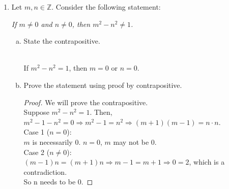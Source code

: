 \documentclass[12pt]{amsart}
\begin{document}
\begin{enumerate}[{\bfseries 1.}]
	\begin{enumerate}[(a)]
	\vspace{0.1in}
	\item State the contrapositive.
	\begin{normalize}
	\vspace{0.1in}
	\\If $x \leq 21$ and $y\leq21$, then $xy\leq441$.
	\\
	\end{normalize}
	\item Prove the original statement using proof by contrapositive.
	\begin{normalize}
	    \begin{proof}
	    \vspace{0.1in}
	    We will prove the contrapositive.
	    \\Let $x\in\mathbb{R}^+$ and $x \leq 21$, $y\in\mathbb{R}^+$ and $y \leq 21$.
	    \\Therefore, $xy \leq 21\cdot 21 = 441$.
	    \end{proof}
	\end{normalize}
	\vfill
	\end{enumerate}

\item Let $m, n\in\mathbb{Z}$.  Consider the following statement:

	\vspace{0.1in}
	\begin{center}
	\noindent
	\textit{If $m\neq 0$ and $n\neq 0$, then $m^{2}-n^{2}\neq 1$.}
	\end{center}

	\begin{enumerate}[(a)]
	\vspace{0.1in}
	\item State the contrapositive.
	\begin{normalize}
	\vspace{0.1in}
	\\If $m^2 - n^2 = 1$, then $m = 0$ or $n = 0$.
	\\
	\end{normalize}
	\item Prove the statement using proof by contrapositive.
	\begin{normalize}
	    \begin{proof}
	    \vspace{0.1in}
	    We will prove the contrapositive.
	    \\Suppose $m^2 - n^2 = 1$. Then, $m^2 - 1 - n^2 = 0 \Rightarrow m^2 - 1 = n^2 \Rightarrow (m+1)(m-1) = n\cdot n$.
	    \\Case 1 ($n = 0$):
	    \\$m$ is necessarily $0$. $n = 0$, $m$ may not be $0$.
	    \\Case 2 ($n \neq 0$):
	    \\$(m - 1)n = (m+1)n \Rightarrow m-1 = m+1 \Rightarrow 0 = 2$, which is a contradiction.
	    \\So n needs to be 0. 
	    \end{proof}
	\end{normalize}
	\vfill
	\vfill
	\end{enumerate}
\end{enumerate}
\end{document}
